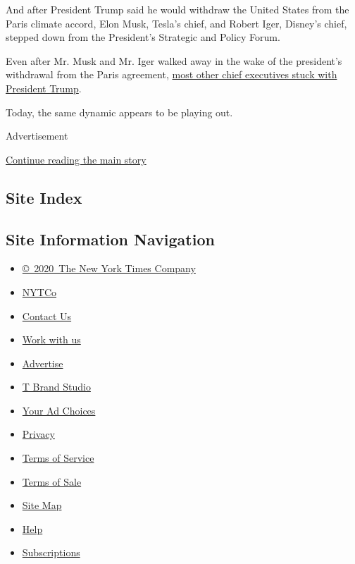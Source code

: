 And after President Trump said he would withdraw the United States from
the Paris climate accord, Elon Musk, Tesla's chief, and Robert Iger,
Disney's chief, stepped down from the President's Strategic and Policy
Forum.

Even after Mr. Musk and Mr. Iger walked away in the wake of the
president's withdrawal from the Paris agreement,
\href{https://www.nytimes3xbfgragh.onion/interactive/2017/06/02/opinion/trump-paris-climate-reacts-advisors.html}{most
other chief executives stuck with President Trump}.

Today, the same dynamic appears to be playing out.

Advertisement

\protect\hyperlink{after-bottom}{Continue reading the main story}

\hypertarget{site-index}{%
\subsection{Site Index}\label{site-index}}

\hypertarget{site-information-navigation}{%
\subsection{Site Information
Navigation}\label{site-information-navigation}}

\begin{itemize}
\tightlist
\item
  \href{https://help.nytimes3xbfgragh.onion/hc/en-us/articles/115014792127-Copyright-notice}{©~2020~The
  New York Times Company}
\end{itemize}

\begin{itemize}
\tightlist
\item
  \href{https://www.nytco.com/}{NYTCo}
\item
  \href{https://help.nytimes3xbfgragh.onion/hc/en-us/articles/115015385887-Contact-Us}{Contact
  Us}
\item
  \href{https://www.nytco.com/careers/}{Work with us}
\item
  \href{https://nytmediakit.com/}{Advertise}
\item
  \href{http://www.tbrandstudio.com/}{T Brand Studio}
\item
  \href{https://www.nytimes3xbfgragh.onion/privacy/cookie-policy\#how-do-i-manage-trackers}{Your
  Ad Choices}
\item
  \href{https://www.nytimes3xbfgragh.onion/privacy}{Privacy}
\item
  \href{https://help.nytimes3xbfgragh.onion/hc/en-us/articles/115014893428-Terms-of-service}{Terms
  of Service}
\item
  \href{https://help.nytimes3xbfgragh.onion/hc/en-us/articles/115014893968-Terms-of-sale}{Terms
  of Sale}
\item
  \href{https://spiderbites.nytimes3xbfgragh.onion}{Site Map}
\item
  \href{https://help.nytimes3xbfgragh.onion/hc/en-us}{Help}
\item
  \href{https://www.nytimes3xbfgragh.onion/subscription?campaignId=37WXW}{Subscriptions}
\end{itemize}

